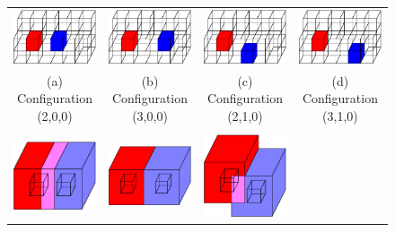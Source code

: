 \begin{figure}
\centering
\begin{tabular}{cccc}
\includegraphics[width=1.2in]{images/config3D_2_0_0.eps} \qquad &
\qquad
\includegraphics[width=1.2in]{images/config3D_3_0_0.eps}
\qquad &
\qquad
\includegraphics[width=1.2in]{images/config3D_2_1_0.eps}
\qquad &
\qquad
\includegraphics[width=1.2in]{images/config3D_3_1_0.eps} \\
(a) Configuration (2,0,0) & (b) Configuration (3,0,0) 
  & (c) Configuration (2,1,0) & (d) Configuration (3,1,0) \\
\\
\includegraphics[width=1.2in]{images/config3D_2_0_0_3x3x3.eps} \qquad &
\qquad
\includegraphics[width=1.2in]{images/config3D_3_0_0_3x3x3.eps}
\qquad &
\qquad
\includegraphics[width=1.2in]{images/config3D_2_1_0_3x3x3.eps}

\end{tabular}
\end{figure}
